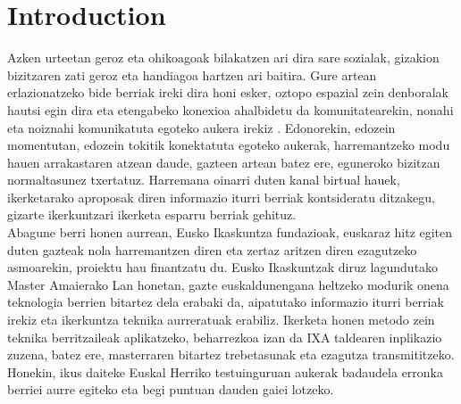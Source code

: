 \documentclass[information,article,submit,moreauthors,pdftex,10pt,a4paper]{Definitions/mdpi}
\begin{document}


\section{Introduction}\label{sec:introduction}

\indent Azken urteetan geroz eta ohikoagoak bilakatzen ari dira sare sozialak, gizakion bizitzaren zati geroz eta handiagoa hartzen ari baitira. Gure artean erlazionatzeko bide berriak ireki dira honi esker, oztopo espazial zein denboralak hautsi egin dira eta etengabeko konexioa ahalbidetu da komunitatearekin, nonahi eta noiznahi komunikatuta egoteko aukera irekiz \citep{castells2005sociedad}. Edonorekin, edozein momentutan, edozein tokitik konektatuta egoteko aukerak, harremantzeko modu hauen arrakastaren atzean daude, gazteen artean batez ere, eguneroko bizitzan normaltasunez txertatuz. Harremana oinarri duten kanal birtual hauek, ikerketarako aproposak diren informazio iturri berriak kontsideratu ditzakegu, gizarte ikerkuntzari ikerketa esparru berriak gehituz.\\
\indent Abagune berri honen aurrean, Eusko Ikaskuntza fundazioak, euskaraz hitz egiten duten gazteak nola harremantzen diren eta zertaz aritzen diren ezagutzeko asmoarekin, proiektu hau finantzatu du. Eusko Ikaskuntzak diruz lagundutako Master Amaierako Lan honetan, gazte euskaldunengana heltzeko modurik onena teknologia berrien bitartez dela erabaki da, aipatutako informazio iturri berriak irekiz eta ikerkuntza teknika aurreratuak erabiliz. Ikerketa honen metodo zein teknika berritzaileak aplikatzeko, beharrezkoa izan da IXA taldearen inplikazio zuzena, batez ere, masterraren bitartez trebetasunak eta ezagutza transmititzeko. Honekin, ikus daiteke Euskal Herriko testuinguruan aukerak badaudela erronka berriei aurre egiteko eta begi puntuan dauden gaiei lotzeko.\\
\end{document}
